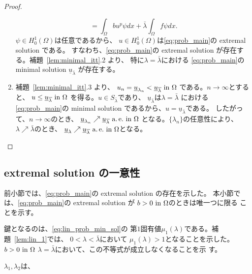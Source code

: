 \begin{proof}
\begin{enumerate}[1.]
\[          = \int_\Omega bu^p \psi dx + \bar{\lambda} \int_\Omega f\psi dx.
        \]
        $\psi \in H_0^1(\Omega)$は任意であるから、
        $u \in H_0^1(\Omega)$は\ref{eq:prob_main}の extremal solution
        である。
        すなわち、\ref{eq:prob_main}の extremal solution
        が存在する。補題~\ref{lem:minimal_itt}.2 より、
        特に$\lambda = \bar{\lambda}$における
        \ref{eq:prob_main}の minimal solution 
        $\underline{u}_{\bar{\lambda}}$
        が存在する。
  \item 補題~\ref{lem:minimal_itt}.3 より、
        $u_n = \underline{u}_{\lambda_n} <
        \underline{u}_{\overline{\lambda}} ~\text{in}~ \Omega$
        である。$n \to \infty$とすると、
        $u \leq \underline{u}_{\overline{\lambda}} ~\text{in}~ \Omega$
        を得る。$u \in S_{\bar{\lambda}}$であり、
        $\underline{u}_{\bar{\lambda}}$は$\lambda = \bar{\lambda}$
        における \ref{eq:prob_main}の minimal solution 
        であるから、$u = \underline{u}_{\bar{\lambda}}$である。
        したがって、$n \to \infty$のとき、
        $\underline{u}_{\lambda_n} \nearrow
        \underline{u}_{\overline{\lambda}} ~\text{a.\,e.}~ \text{in}~ \Omega$
        となる。$\{ \lambda_n \}$の任意性により、
        $\lambda \nearrow \bar{\lambda}$のとき、
        $\underline{u}_{\lambda} \nearrow
        \underline{u}_{\overline{\lambda}} ~\text{a.\,e.}~ \text{in}~ \Omega$となる。\qedhere
 \end{enumerate}
\end{proof}

\subsection{extremal solution の一意性}

前小節では、\ref{eq:prob_main}の extremal solution の存在を示した。
本小節では、\ref{eq:prob_main}の extremal solution が
$b > 0 ~\text{in}~ \Omega$のときは唯一つに限る
ことを示す。

鍵となるのは、\eqref{eq:lin_prob_min_sol}の
第$1$固有値$\mu_1(\lambda)$である。補題~\ref{lem:lin_1}では、
$0 < \lambda < \bar{\lambda}$において
$\mu_1(\lambda) > 1$となることを示した。
$b > 0 ~\text{in}~ \Omega$
$\lambda = \bar{\lambda}$において、この不等式が成立しなくなることを示
す。

\begin{lem} \label{rem:mu1_dec}
 $\lambda_1, \lambda_2$は、
\end{lem}

